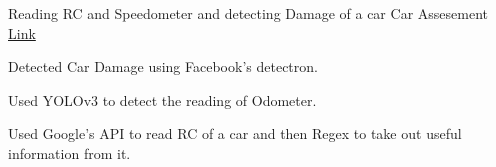 \begin{cventries}
  \cventry
    {Reading RC and Speedometer and detecting Damage of a car}
    {Car Assesement}%
    {\href{https://github.com/ravising-h/Car-Damage-Detection-Using-Detectron}{Link}} %
    {} %
    {
      \begin{cvitems} %
        \item Detected Car Damage using  Facebook's detectron.
        \item Used YOLOv3 to detect the reading of Odometer.
        \item  Used Google's API to read RC of a car and then Regex to take out useful information from it.
      \end{cvitems}
    }



\end{cventries}


